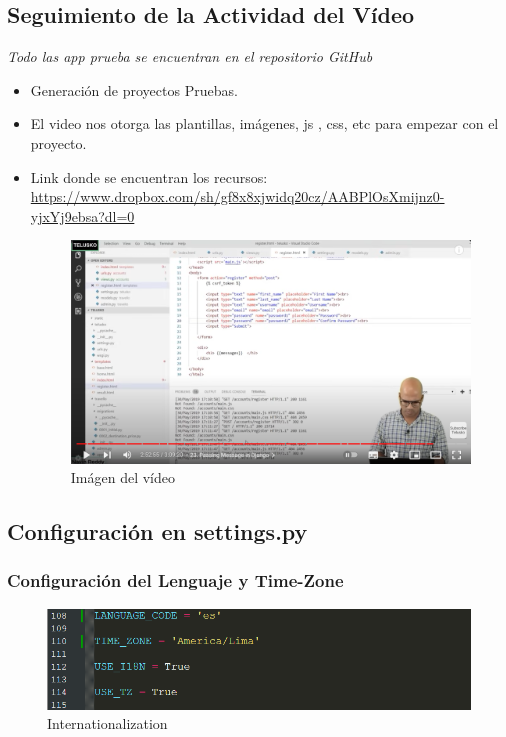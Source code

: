 \documentclass{article}
\begin{document}
  \subsection{Seguimiento de la Actividad del Vídeo}
  \textit{Todo las app prueba se encuentran en el repositorio GitHub}
  \begin{itemize}
    \item Generación de proyectos Pruebas.
    \item El video nos otorga las plantillas, imágenes, js , css, etc para empezar con el proyecto.
    \item Link donde se encuentran los recursos: \url{https://www.dropbox.com/sh/gf8x8xjwidq20cz/AABPlOsXmijnz0-yjxYj9ebsa?dl=0}
    \begin{figure}[H]
      \centering
      \includegraphics[width=1\textwidth, keepaspectratio]{img/video.png}
      \caption{Imágen del vídeo}
    \end{figure}
    \newpage
  \end{itemize}
  

  \subsection{Configuración en settings.py}
  

  \subsubsection{Configuración del Lenguaje y Time-Zone}
  \begin{figure}[H]
    \centering
    \includegraphics[width=1\textwidth, keepaspectratio]{img/lenguaje.png}
    \caption{Internationalization}
  \end{figure}
  
\end{document}
